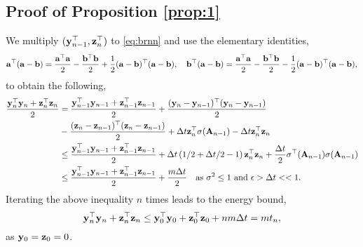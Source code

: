\documentclass{article} \usepackage{iclr2021_conference,times}
\newcommand{\by}{{\bf y}}
\newcommand{\bz}{{\bf z}}
\newcommand{\bb}{{\bf b}}
\newcommand{\bA}{{\bf A}}
\newcommand{\ep}{\epsilon}
\newcommand{\Dt}{{\Delta t}}
\begin{document}
\subsection{Proof of Proposition \ref{prop:1}}
\label{app:proof_energy_bound}
We multiply $({\by}_{n-1}^\top, {\bz}^\top_n)$ to \eqref{eq:brnn} and use the elementary identities,
\begin{align*}
{\bf a}^\top({\bf a}-\bb) = \frac{{\bf a}^\top {\bf a}}{2} - \frac{\bb^\top \bb}{2} + \frac{1}{2}({\bf a}-\bb)^\top({\bf a}-\bb), \quad
\bb^\top({\bf a}-\bb) = \frac{{\bf a}^\top {\bf a}}{2} - \frac{\bb^\top \bb}{2} - \frac{1}{2}({\bf a}-\bb)^\top({\bf a}-\bb),
\end{align*}
to obtain the following,
\begin{align*}
\frac{\by_n^\top \by_n + \bz_n^\top \bz_n}{2} &= \frac{\by_{n-1}^\top \by_{n-1} + \bz_{n-1}^\top \bz_{n-1}}{2} + \frac{(\by_n- \by_{n-1})^\top (\by_n- \by_{n-1})}{2} \\
&- \frac{(\bz_n- \bz_{n-1})^\top (\bz_n- \bz_{n-1})}{2}+  \Dt \bz_n^\top \sigma(\bA_{n-1}) -  \Dt \bz_n^\top\bz_n \\
&\leq  \frac{\by_{n-1}^\top \by_{n-1} + \bz_{n-1}^\top \bz_{n-1}}{2} + \Dt \left(1/2+ \Dt/2 - 1\right) \bz_n^\top\bz_n + \frac{\Dt}{2}\sigma^\top(\bA_{n-1})\sigma(\bA_{n-1}) \\
&\leq  \frac{\by_{n-1}^\top \by_{n-1} + \bz_{n-1}^\top \bz_{n-1}}{2} + \frac{m\Dt}{2} \quad {\rm as}~\sigma^2 \leq 1~{\rm and }~\ep > \Dt << 1.
\end{align*} 
Iterating the above inequality $n$ times leads to the energy bound,
\begin{equation}
\label{eq:enb10}
\by_n^\top \by_n + \bz_n^\top \bz_n \leq \by_0^\top \by_0 + \bz_0^\top \bz_0 + n m\Dt = mt_n,
\end{equation}
as $\by_0=\bz_0 = 0$.
\end{document}
